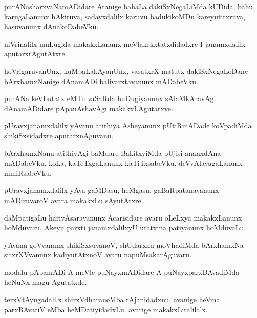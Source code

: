 \begin{mng}
purANasharxvaNamADidare Atanige bahaLa dakiSxNegaLiMda kUDida, bahu karugaLanunx hAkiruva, sadayxdalilx karuvu badukikoMDu kareyutitxruva, hasuvanunx dAnakoDabeVku.
\end{mng}

\begin{mng}
niVrinalilx muLugida makakxLanunx meVlakekxtatxdidadxre I janamxdalilx aputarxrAgutAtxre.
\end{mng}

\begin{mng}
hoVrigaruvanUnx, kuMbaLakAyanUnx, vasatxrX matutx dakiSxNegaLoDane bArxhamxNanige dAnamADi balivarxtavanunx mADabeVku.
\end{mng}

\begin{mng}
purANa keVLutatx eMTu vaSaRda huDugiyanunx sAlaMkAravAgi dAnamADidare pApanAshavAgi makakxLAgutatxve.
\end{mng}

\begin{mng}
pUravxjanamxdalilx yAvanu atithiya Asheyanunx pUtiRmADade koVpadiMda shikiSxsidadxre aputarxnAguvanu.
\end{mng}

\begin{mng}
bArxhamxNanu atithiyAgi baMdare BakitxyiMda pUjisi ananxdAna mADabeVku. koLa, kaTeTxgaLanunx kaTiTxsabeVku. deVvAlayagaLanunx nimiRsabeVku.
\end{mng}

\begin{mng}
pUravxjanamxdalilx yAva gaMDasu, heMgasu, gaBaRpatanavanunx mADiruvaroV avara makakxLu sAyutAtxre.
\end{mng}

\begin{mng}
daMpatigaLu harivAsaravanunx Acarisidare avaru oLeLxya makakxLanunx hoMduvaru. Akeyu parxti janamxdalilxyU utatxma patiyanunx hoMduvaLu.
\end{mng}

\begin{mng}
yAvanu goVvanunx shikiSxsuvanoV, shUdarxnu moVhadiMda bArxhamxNa sitxrXVyanunx kadiyutAtxnoV avaru napuMsakarAguvaru.
\end{mng}

\begin{mng}
modalu pApamADi A meVle puNayxmADidare A puNayxparxBAvadiMda heNuNx magu Agutatxde.
\end{mng}

\begin{mng}
terxVtAyugadalilx shirxVdharaneMba rAjanidadxnu. avanige heVma parxBAvatiV eMba heMDatiyidadxLu. avarige makakxLiralilalx.
\end{mng}

